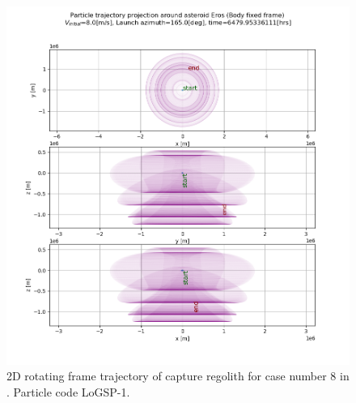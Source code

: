 \documentclass[print]{tudelft-report}
\begin{document}
\begin{appendices}
\begin{figure}[htb]
    \includegraphics[width=\textwidth, height=\textheight]{Results/Images/longest_edge_perturbations/3.2Density_1cmSize/2dTrajectory_8ms_165Azimuth_45solarPhase_bodyFrame.png}
    \caption{2D rotating frame trajectory of capture regolith for case number 8 in . Particle code LoGSP-1.}
    \label{fig:LoGSP_1_capture_case_8_2d_traj_bodyFrame}
    \end{figure}
    \FloatBarrier
\end{appendices}
\end{document}
